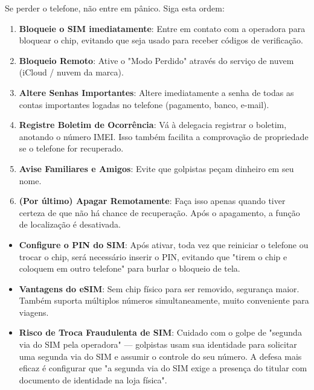 
Se perder o telefone, não entre em pânico. Siga esta ordem:

\begin{enumerate}
  \item \textbf{Bloqueie o SIM imediatamente}: Entre em contato com a operadora para bloquear o chip, evitando que seja usado para receber códigos de verificação.
  \item \textbf{Bloqueio Remoto}: Ative o "Modo Perdido" através do serviço de nuvem (iCloud / nuvem da marca).
  \item \textbf{Altere Senhas Importantes}: Altere imediatamente a senha de todas as contas importantes logadas no telefone (pagamento, banco, e-mail).
  \item \textbf{Registre Boletim de Ocorrência}: Vá à delegacia registrar o boletim, anotando o número IMEI. Isso também facilita a comprovação de propriedade se o telefone for recuperado.
  \item \textbf{Avise Familiares e Amigos}: Evite que golpistas peçam dinheiro em seu nome.
  \item \textbf{(Por último) Apagar Remotamente}: Faça isso apenas quando tiver certeza de que não há chance de recuperação. Após o apagamento, a função de localização é desativada.
\end{enumerate}


\begin{itemize}
  \item \textbf{Configure o PIN do SIM}: Após ativar, toda vez que reiniciar o telefone ou trocar o chip, será necessário inserir o PIN, evitando que "tirem o chip e coloquem em outro telefone" para burlar o bloqueio de tela.
  \item \textbf{Vantagens do eSIM}: Sem chip físico para ser removido, segurança maior. Também suporta múltiplos números simultaneamente, muito conveniente para viagens.
  \item \textbf{Risco de Troca Fraudulenta de SIM}: Cuidado com o golpe de "segunda via do SIM pela operadora" — golpistas usam sua identidade para solicitar uma segunda via do SIM e assumir o controle do seu número. A defesa mais eficaz é configurar que "a segunda via do SIM exige a presença do titular com documento de identidade na loja física".
\end{itemize}

